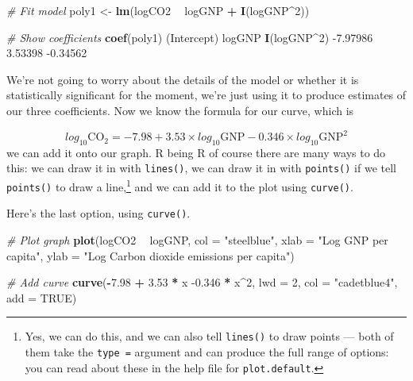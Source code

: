 \documentclass[
]{book}
\newenvironment{Shaded}{\begin{snugshade}}{\end{snugshade}}
\newcommand{\CommentTok}[1]{\textcolor[rgb]{0.56,0.35,0.01}{\textit{#1}}}
\newcommand{\DataTypeTok}[1]{\textcolor[rgb]{0.13,0.29,0.53}{#1}}
\newcommand{\DecValTok}[1]{\textcolor[rgb]{0.00,0.00,0.81}{#1}}
\newcommand{\FloatTok}[1]{\textcolor[rgb]{0.00,0.00,0.81}{#1}}
\newcommand{\KeywordTok}[1]{\textcolor[rgb]{0.13,0.29,0.53}{\textbf{#1}}}
\newcommand{\NormalTok}[1]{#1}
\newcommand{\OperatorTok}[1]{\textcolor[rgb]{0.81,0.36,0.00}{\textbf{#1}}}
\newcommand{\OtherTok}[1]{\textcolor[rgb]{0.56,0.35,0.01}{#1}}
\newcommand{\StringTok}[1]{\textcolor[rgb]{0.31,0.60,0.02}{#1}}
\begin{document}
\begin{Shaded}
\begin{Highlighting}[]
\CommentTok{# Fit model}
\NormalTok{poly1 <-}\StringTok{ }\KeywordTok{lm}\NormalTok{(logCO2 }\OperatorTok{~}\StringTok{ }\NormalTok{logGNP }\OperatorTok{+}\StringTok{ }\KeywordTok{I}\NormalTok{(logGNP}\OperatorTok{^}\DecValTok{2}\NormalTok{))}

\CommentTok{# Show coefficients}
\KeywordTok{coef}\NormalTok{(poly1)}
\NormalTok{(Intercept)      logGNP }\KeywordTok{I}\NormalTok{(logGNP}\OperatorTok{^}\DecValTok{2}\NormalTok{) }
   \FloatTok{-7.97986}     \FloatTok{3.53398}    \FloatTok{-0.34562} 
\end{Highlighting}
\end{Shaded}

We're not going to worry about the details of the model or whether it is statistically significant for the moment, we're just using it to produce estimates of our three coefficients. Now we know the formula for our curve, which is

\[ log_{10} \mathrm{CO}_{2} = -7.98 + 3.53 \times log_{10} \mathrm{GNP} - 0.346 \times log_{10} \mathrm{GNP} ^{2} \]
we can add it onto our graph. R being R of course there are many ways to do this: we can draw it in with \texttt{lines()}, we can draw it in with \texttt{points()} if we tell \texttt{points()} to draw a line,\footnote{Yes, we can do this, and we can also tell \texttt{lines()} to draw points --- both of them take the \texttt{type\ =} argument and can produce the full range of options: you can read about these in the help file for \texttt{plot.default}.} and we can add it to the plot using \texttt{curve()}.

Here's the last option, using \texttt{curve()}.

\begin{Shaded}
\begin{Highlighting}[]

\CommentTok{# Plot graph}
\KeywordTok{plot}\NormalTok{(logCO2 }\OperatorTok{~}\StringTok{ }\NormalTok{logGNP,}
     \DataTypeTok{col =} \StringTok{"steelblue"}\NormalTok{,}
     \DataTypeTok{xlab =} \StringTok{"Log GNP per capita"}\NormalTok{,}
     \DataTypeTok{ylab =} \StringTok{"Log Carbon dioxide emissions per capita"}\NormalTok{)}

\CommentTok{# Add curve}
\KeywordTok{curve}\NormalTok{(}\OperatorTok{-}\FloatTok{7.98} \OperatorTok{+}\StringTok{ }\FloatTok{3.53} \OperatorTok{*}\StringTok{ }\NormalTok{x }\FloatTok{-0.346} \OperatorTok{*}\StringTok{ }\NormalTok{x}\OperatorTok{^}\DecValTok{2}\NormalTok{,}
      \DataTypeTok{lwd =} \DecValTok{2}\NormalTok{,}
      \DataTypeTok{col =} \StringTok{"cadetblue4"}\NormalTok{,}
      \DataTypeTok{add =} \OtherTok{TRUE}\NormalTok{)}
\end{Highlighting}
\end{Shaded}
\end{document}

